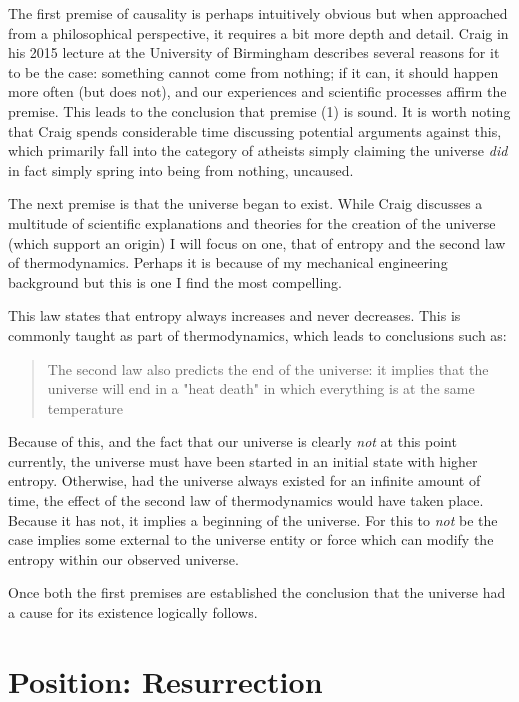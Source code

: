 \documentclass[12pt]{turabian-researchpaper}
\begin{document}
The first premise of causality is perhaps intuitively obvious but when approached from a philosophical perspective, it requires a bit more depth and detail. Craig in his 2015 lecture at the University of Birmingham describes several reasons for it to be the case: something cannot come from nothing; if it can, it should happen more often (but does not), and our experiences and scientific processes affirm the premise.\autocite{craig2015} This leads to the conclusion that premise (1) is sound. It is worth noting that Craig spends considerable time discussing potential arguments against this, which primarily fall into the category of atheists simply claiming the universe \textit{did} in fact simply spring into being from nothing, uncaused.

The next premise is that the universe began to exist. While Craig discusses a multitude of scientific explanations and theories for the creation of the universe (which support an origin) I will focus on one, that of entropy and the second law of thermodynamics. Perhaps it is because of my mechanical engineering background but this is one I find the most compelling.

This law states that entropy always increases and never decreases. This is commonly taught as part of thermodynamics, which leads to conclusions such as:\autocite{duffy1999}

\begin{quotation}
The second law also predicts the end of the universe: it implies that the universe will end in a "heat death" in which everything is at the same temperature
\end{quotation}

Because of this, and the fact that our universe is clearly \textit{not} at this point currently, the universe must have been started in an initial state with higher entropy. Otherwise, had the universe always existed for an infinite amount of time, the effect of the second law of thermodynamics would have taken place. Because it has not, it implies a beginning of the universe. For this to \textit{not} be the case implies some external to the universe entity or force which can modify the entropy within our observed universe.

Once both the first premises are established the conclusion that the universe had a cause for its existence logically follows.

\section{Position: Resurrection} 
\end{document}
